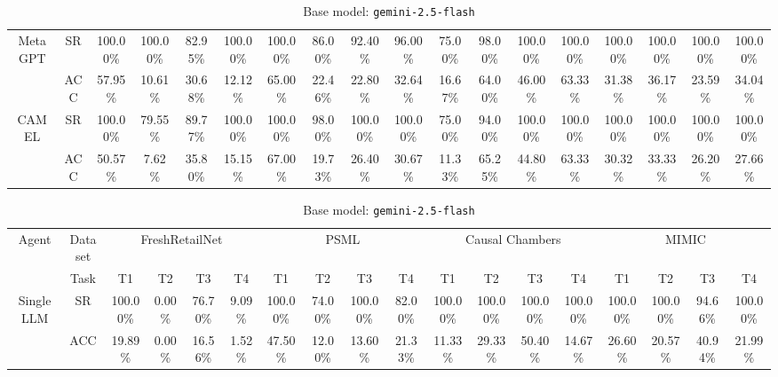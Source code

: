 \begin{table}[t]
\begin{subtable}[t]{\textwidth}
\begin{tabular}{c|c|cccc|cccc|cccc|cccc}
\multirow{2}{*}{MetaGPT}
& SR
& 100.00\% & 100.00\% & 82.95\% & 100.00\%
& 100.00\% & 86.00\% & 92.40\% & 96.00\%
& 75.00\% & 98.00\% & 100.00\% & 100.00\%
& 100.00\% & 100.00\% & 100.00\% & 100.00\% \\
& ACC
& 57.95\% & 10.61\% & 30.68\% & 12.12\%
& 65.00\% & 22.46\% & 22.80\% & 32.64\%
& 16.67\% & 64.00\% & 46.00\% & 63.33\%
& 31.38\% & 36.17\% & 23.59\% & 34.04\% \\
\midrule

\multirow{2}{*}{CAMEL}
& SR
& 100.00\% & 79.55\% & 89.77\% & 100.00\%
& 100.00\% & 98.00\% & 100.00\% & 100.00\%
& 75.00\% & 94.00\% & 100.00\% & 100.00\%
& 100.00\% & 100.00\% & 100.00\% & 100.00\% \\
& ACC
& 50.57\% & 7.62\% & 35.80\% & 15.15\%
& 67.00\% & 19.73\% & 26.40\% & 30.67\%
& 11.33\% & 65.25\% & 44.80\% & 63.33\%
& 30.32\% & 33.33\% & 26.20\% & 27.66\% \\
\bottomrule
\end{tabular}
\end{subtable}

\vspace{2pt}

\begin{subtable}[t]{\textwidth}
\centering
\caption{Base model: \texttt{gemini-2.5-flash}}
\setlength{\tabcolsep}{2.8pt}
\renewcommand{\arraystretch}{1.2}
\begin{tabular}{c|c|cccc|cccc|cccc|cccc}
\toprule
\multirow{2}{*}{Agent} & Dataset
& \multicolumn{4}{c|}{FreshRetailNet}
& \multicolumn{4}{c|}{PSML}
& \multicolumn{4}{c|}{Causal Chambers}
& \multicolumn{4}{c}{MIMIC} \\
\cmidrule(lr){3-6}
\cmidrule(lr){7-10}
\cmidrule(lr){11-14}
\cmidrule(lr){15-18}

& Task
& T1 & T2 & T3 & \multicolumn{1}{c|}{T4}
& T1 & T2 & T3 & \multicolumn{1}{c|}{T4}
& T1 & T2 & T3 & \multicolumn{1}{c|}{T4}
& T1 & T2 & T3 & T4 \\
\midrule

\multirow{2}{*}{Single LLM}
& SR
& 100.00\% & 0.00\% & 76.70\% & \multicolumn{1}{c|}{9.09\%}
& 100.00\% & 74.00\% & 100.00\% & \multicolumn{1}{c|}{82.00\%}
& 100.00\% & 100.00\% & 100.00\% & \multicolumn{1}{c|}{100.00\%}
& 100.00\% & 100.00\% & 94.66\% & 100.00\% \\
& ACC
& 19.89\% & 0.00\% & 16.56\% & \multicolumn{1}{c|}{1.52\%}
& 47.50\% & 12.00\% & 13.60\% & \multicolumn{1}{c|}{21.33\%}
& 11.33\% & 29.33\% & 50.40\% & \multicolumn{1}{c|}{14.67\%}
& 26.60\% & 20.57\% & 40.94\% & 21.99\% \\
\midrule


\end{tabular}
\end{subtable}
\end{table}
